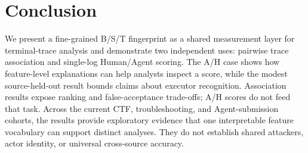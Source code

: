 \documentclass[10pt]{article}
\begin{document}
\section{Conclusion}
We present a fine-grained B/S/T fingerprint as a shared measurement layer for terminal-trace analysis and demonstrate two independent uses: pairwise trace association and single-log Human/Agent scoring. The A/H case shows how feature-level explanations can help analysts inspect a score, while the modest source-held-out result bounds claims about executor recognition. Association results expose ranking and false-acceptance trade-offs; A/H scores do not feed that task. Across the current CTF, troubleshooting, and Agent-submission cohorts, the results provide exploratory evidence that one interpretable feature vocabulary can support distinct analyses. They do not establish shared attackers, actor identity, or universal cross-source accuracy.
\end{document}
